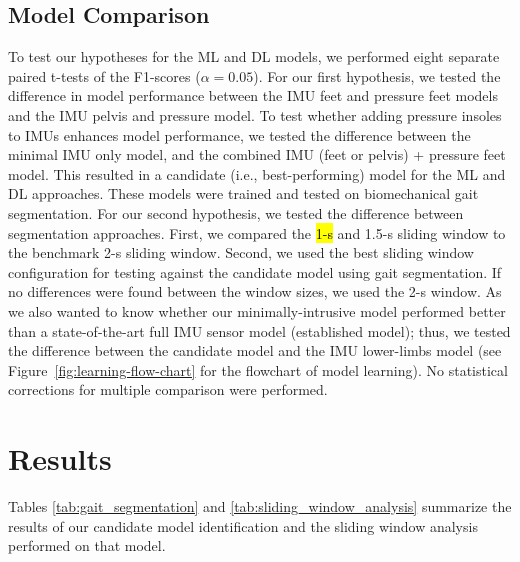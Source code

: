 \documentclass[sensors,article,accept,pdftex,moreauthors]{Definitions/mdpi}
\begin{document}
\subsection{Model Comparison}
To test our hypotheses for the ML and DL models, we performed eight separate paired t-tests of the F1-scores ($\alpha = 0.05$). For our first hypothesis, we tested the difference in model performance between the IMU feet and pressure feet models {and the IMU pelvis and pressure model}. To test whether adding pressure insoles to IMUs enhances model performance, we tested the difference between the {minimal} IMU only model, and the combined IMU {(feet or pelvis)} + pressure feet model. {This resulted in a candidate (i.e., best-performing) model for the ML and DL approaches. These models were trained and tested on biomechanical gait segmentation.}  For our second hypothesis, we tested the difference between segmentation approaches. {First, we compared the \hl{1-s} %
 and 1.5-s sliding window to the benchmark 2-s sliding window. Second, we used the best sliding window configuration for testing against the candidate model using gait segmentation. If no differences were found between the window sizes, we used the 2-s window}. As we also wanted to know whether our minimally-intrusive model performed better than a state-of-the-art full IMU sensor model (established model); thus, we tested the difference between the {candidate} model and the IMU lower-limbs model {(see Figure~\ref{fig:learning-flow-chart} for the flowchart of model learning). No statistical corrections for multiple comparison were performed.} 



\section{Results}
\label{sec:Results}
{Tables \ref{tab:gait_segmentation} and \ref{tab:sliding_window_analysis} summarize the results of our candidate model identification and the sliding window analysis performed on that model.} 
\end{document}
